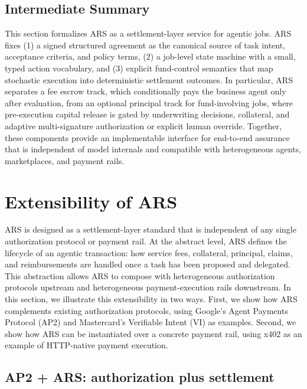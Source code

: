 \documentclass{article} %
\begin{document}
\subsection{Intermediate Summary}
This section formalizes \textsc{ARS} as a settlement-layer service for agentic jobs. \textsc{ARS} fixes (1) a signed structured agreement as the canonical source of task intent, acceptance criteria, and policy terms, (2) a job-level state machine with a small, typed action vocabulary, and (3) explicit fund-control semantics that map stochastic execution into deterministic settlement outcomes. In particular, \textsc{ARS} separates a fee escrow track, which conditionally pays the business agent only after evaluation, from an optional principal track for fund-involving jobs, where pre-execution capital release is gated by underwriting decisions, collateral, and adaptive multi-signature authorization or explicit human override. Together, these components provide an implementable interface for end-to-end assurance that is independent of model internals and compatible with heterogeneous agents, marketplaces, and payment rails.

\section{Extensibility of \textsc{ARS}}
\label{sec:extensibility}

\textsc{ARS} is designed as a settlement-layer standard that is independent of any single authorization protocol or payment rail. At the abstract level, \textsc{ARS} defines the lifecycle of an agentic transaction: how service fees, collateral, principal, claims, and reimbursements are handled once a task has been proposed and delegated. This abstraction allows \textsc{ARS} to compose with heterogeneous authorization protocols upstream and heterogeneous payment-execution rails downstream. In this section, we illustrate this extensibility in two ways. First, we show how \textsc{ARS} complements existing authorization protocols, using Google's Agent Payments Protocol (AP2) and Mastercard's Verifiable Intent (VI) as examples. Second, we show how \textsc{ARS} can be instantiated over a concrete payment rail, using x402 as an example of HTTP-native payment execution.

\subsection{AP2 + \textsc{ARS}: authorization plus settlement}
\end{document}
